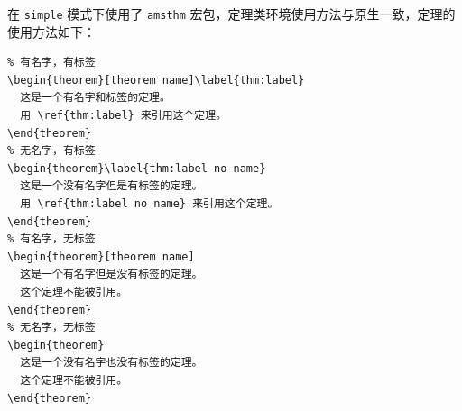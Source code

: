\documentclass[lang=cn,10pt,scheme=chinese]{boyogalaelegantbook}
\begin{document}
在 \lstinline{simple} 模式下使用了 \lstinline{amsthm} 宏包，定理类环境使用方法与原生一致，定理的使用方法如下：

\begin{lstlisting}
% 有名字，有标签
\begin{theorem}[theorem name]\label{thm:label}
  这是一个有名字和标签的定理。
  用 \ref{thm:label} 来引用这个定理。
\end{theorem}
% 无名字，有标签
\begin{theorem}\label{thm:label no name}
  这是一个没有名字但是有标签的定理。
  用 \ref{thm:label no name} 来引用这个定理。
\end{theorem}
% 有名字，无标签
\begin{theorem}[theorem name]
  这是一个有名字但是没有标签的定理。
  这个定理不能被引用。
\end{theorem}
% 无名字，无标签
\begin{theorem}
  这是一个没有名字也没有标签的定理。
  这个定理不能被引用。
\end{theorem}
\end{lstlisting}


\end{document}
